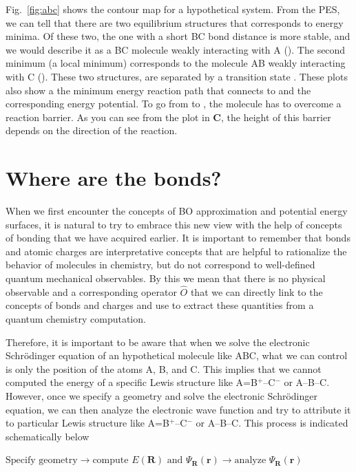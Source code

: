 \documentclass[../Main/chem371-notes.tex]{subfiles}
\begin{document}
Fig.~\ref{fig:abc} shows the contour map for a hypothetical  system.
From the PES, we can tell that there are two equilibrium structures that corresponds to energy minima.
Of these two, the one with a short BC bond distance is more stable, and we would describe it as a BC molecule weakly interacting with A ().
The second minimum (a local minimum) corresponds to the molecule AB weakly interacting with C ().
These two structures, are separated by a transition state .
These plots also show a the minimum energy reaction path that connects  to  and the corresponding energy potential.
To go from  to , the molecule has to overcome a reaction barrier.
As you can see from the plot in \textbf{C}, the height of this barrier depends on the direction of the reaction.

\section{Where are the bonds?}

When we first encounter the concepts of BO approximation and potential energy surfaces, it is natural to try to embrace this new view with the help of concepts of bonding that we have acquired earlier.
It is important to remember that bonds and atomic charges are interpretative concepts that are helpful to rationalize the behavior of molecules in chemistry, but do not correspond to well-defined quantum mechanical observables.
By this we mean that there is no physical observable and a corresponding operator $\hat{O}$ that we can directly link to the concepts of bonds and charges and use to extract these quantities from a quantum chemistry computation.

Therefore, it is important to be aware that when we solve the electronic Schr\"{o}dinger equation of an hypothetical molecule like ABC, what we can control is only the position of the atoms A, B, and C.
This implies that we cannot computed the energy of a specific Lewis structure like A=B$^+$--C$^-$ or A--B--C.
However, once we specify a geometry and solve the electronic Schr\"{o}dinger equation, we can then analyze the electronic wave function and try to attribute it to particular Lewis structure like A=B$^+$--C$^-$ or A--B--C.
This process is indicated schematically below

\begin{ibox}
\begin{center}
$\text{Specify geometry} \rightarrow \text{compute } E(\mathbf{R}) \text{ and } \Psi_\mathbf{R}(\mathbf{r}) \rightarrow \text{analyze } \Psi_\mathbf{R}(\mathbf{r})$
\end{center}
\end{ibox}
\end{document}
